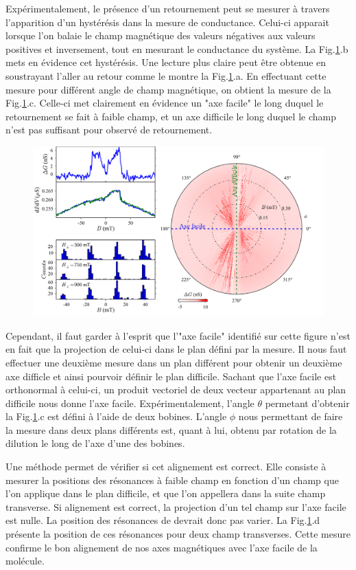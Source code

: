 Expérimentalement, le présence d'un retournement peut se mesurer à travers l'apparition d'un hystérésis dans la mesure de conductance. Celui-ci apparait lorsque l'on balaie le champ magnétique des valeurs négatives aux valeurs positives et inversement, tout en mesurant le conductance du système. La Fig.\ref{alignement}.b mets en évidence cet hystérésis. Une lecture plus claire peut être obtenue en soustrayant l'aller au retour comme le montre la Fig.\ref{alignement}.a. En effectuant cette mesure pour différent angle de champ magnétique, on obtient la mesure de la Fig.\ref{alignement}.c. Celle-ci met clairement en évidence un "axe facile" le long duquel le retournement se fait à faible champ, et un axe difficile le long duquel le champ n'est pas suffisant pour observé de retournement.

\begin{figure}
\includegraphics[scale=0.5]{Resultats/Chap1/Figure5/figure5.pdf} 
\caption{}
\label{alignement}
\end{figure}

Cependant, il faut garder à l'esprit que l'"axe facile" identifié sur cette figure n'est en fait que la projection de celui-ci dans le plan défini par la mesure. Il nous faut effectuer une deuxième mesure dans un plan différent pour obtenir un deuxième axe difficle et ainsi pourvoir définir le plan difficile. Sachant que l'axe facile est orthonormal à celui-ci, un produit vectoriel de deux vecteur appartenant au plan difficile nous donne l'axe facile. Expérimentalement, l'angle $\theta$ permetant d'obtenir la Fig.\ref{alignement}.c est défini à l'aide de deux bobines. L'angle $\phi$ nous permettant de faire la mesure dans deux plans différents est, quant à lui, obtenu par rotation de la dilution le long de l'axe d'une des bobines.


Une méthode permet de vérifier si cet alignement est correct.  Elle consiste à mesurer la positions des résonances à faible champ en fonction d'un champ que l'on applique dans le plan difficile, et que l'on appellera dans la suite champ transverse. Si alignement est correct, la projection d'un tel champ sur l'axe facile est nulle. La position des résonances de devrait donc pas varier. La Fig.\ref{alignement}.d présente la position de ces résonances pour deux champ transverses. Cette mesure confirme le bon alignement de nos axes magnétiques avec l'axe facile de la molécule.